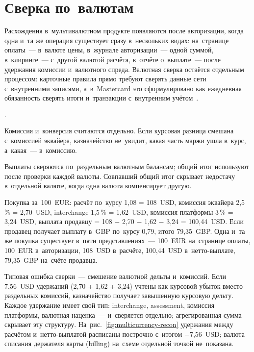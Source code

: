 \FloatBarrier
\section{Сверка по~валютам}\label{sec:mc-fx-risk}

Расхождения в~мультивалютном продукте появляются после авторизации, когда одна
и~та же операция существует сразу в~нескольких видах: на~странице
оплаты~--- в~валюте цены, в~журнале авторизации~--- одной суммой, в~клиринге~---
с~другой валютой расчёта, в~отчёте о~выплате~--- после удержания комиссии
и~валютного спреда. Валютная сверка остаётся отдельным процессом: карточные
правила прямо требуют сверять данные сети с~внутренними записями,
а~в~Mastercard это сформулировано как ежедневная обязанность сверять итоги
и~транзакции с~внутренним учётом~\cite{mc-rules}.

.

Комиссия и~конверсия считаются отдельно. Если курсовая разница смешана
с~комиссией эквайера, казначейство не~увидит, какая часть маржи ушла в~курс,
а~какая~--- в~комиссию.

Выплаты сверяются по~раздельным валютным балансам; общий итог используют после
проверки каждой валюты. Совпавший общий итог скрывает недостачу в~отдельной
валюте, когда одна валюта компенсирует другую.

Покупка за~100~EUR: расчёт по~курсу 1,08 = 108~USD, комиссия эквайера 2,5\,\% =
2,70~USD, interchange 1,5\,\% = 1,62~USD, комиссия платформы 3\,\% = 3,24~USD,
выплата продавцу = 108 $-$ 2,70 $-$ 1,62 $-$ 3,24 = 100,44~USD. Если продавец
получает выплату в~GBP по~курсу 0,79, итого 79,35~GBP. Одна и~та же покупка
существует в~пяти представлениях~--- 100~EUR на~странице оплаты, 100~EUR
в~авторизации, 108~USD в~расчёте, 100,44~USD в~нетто-выплате, 79,35~GBP
на~счёте продавца.

Типовая ошибка сверки~--- смешение валютной дельты и~комиссий. Если 7,56~USD
удержаний (2,70 + 1,62 + 3,24) учтены как курсовой убыток вместо раздельных
комиссий, казначейство получает завышенную курсовую дельту. Каждое удержание
имеет свой тип: interchange, assessment, комиссия платформы, валютная
наценка~--- и~сверяется отдельно; агрегированная сумма скрывает эту структуру.
На~рис.~\ref{fig:multicurrency-recon} удержания между расчётом и~нетто-выплатой
расписаны построчно с~итогом $-$7,56~USD; валюта списания держателя карты (billing)
на~схеме отдельной точкой не~показана.

